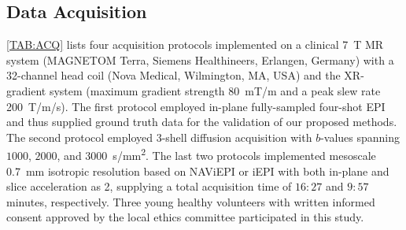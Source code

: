 \documentclass[journal,twoside,web]{ieeecolor}
\begin{document}
	\subsection{Data Acquisition}

    \cref{TAB:ACQ} lists four acquisition protocols implemented on
	a clinical \SI{7}{\tesla} MR system
	(MAGNETOM Terra, Siemens Healthineers, Erlangen, Germany)
	with a 32-channel head coil (Nova Medical, Wilmington, MA, USA)
	and the XR-gradient system
	(maximum gradient strength \SI{80}{\milli\tesla/\meter} and
	a peak slew rate \SI{200}{\tesla/\meter/\second}).
    The first protocol employed in-plane fully-sampled four-shot EPI
    and thus supplied ground truth data for the validation
    of our proposed methods.
    The second protocol employed 3-shell diffusion acquisition 
    with $b$-values spanning $1000$, $2000$, and $3000$~\si{s/mm^2}.
    The last two protocols implemented mesoscale \SI{0.7}{mm}
    isotropic resolution based on NAViEPI or iEPI
    with both in-plane and slice acceleration as 2,
	supplying a total acquisition time of $16:27$ and $9:57$ minutes, respectively.
    Three young healthy volunteers with written informed consent
	approved by the local ethics committee
	participated in this study.


%
%
\end{document}
